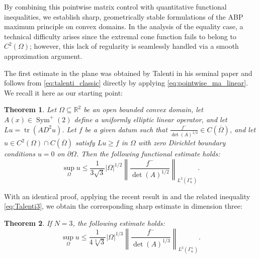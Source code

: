 \documentclass{article}
\newtheorem{theorem}{Theorem}[section]
\numberwithin{equation}{section}
\begin{document}
\noindent By combining this pointwise matrix control with quantitative functional inequalities, we establish sharp, geometrically stable formulations of the ABP maximum principle on convex domains. In the analysis of the equality case, a technical difficulty arises since the extremal cone function fails to belong to $C^2(\Omega)$; however, this lack of regularity is seamlessly handled via a smooth approximation argument.

\noindent The first estimate in the plane was obtained by Talenti in his seminal paper \cite{talenti1981} and follows from \eqref{eq:talenti_classic} directly by applying \eqref{eq:pointwise_ma_linear}. We recall it here as our starting point:

\begin{theorem}
Let $\Omega \subseteq \mathbb{R}^2$ be an open bounded convex domain, let $A(x) \in \operatorname{Sym}^+(2)$ define a uniformly elliptic linear operator, and let $Lu = \operatorname{tr}(A D^2u)$. Let $f$ be a given datum such that $\frac{f^-}{\det(A)^{1/2}} \in C(\overline{\Omega})$, and let $u \in C^2(\Omega) \cap C(\overline{\Omega})$ satisfy $Lu \ge f$ in $\Omega$ with zero Dirichlet boundary conditions $u=0$ on $\partial \Omega$. Then the following functional estimate holds:
\begin{equation}
\sup_\Omega u \le \frac{1}{3\sqrt{3}}|\Omega|^{1/2} \left\| \frac{f^-}{\det(A)^{1/2}} \right\|_{L^2(\Gamma^+_u)}.
\end{equation}
\end{theorem}

\noindent With an identical proof, applying the recent result in \cite{chen2026mahler} and the related inequality \eqref{eq:Talenti3}, we obtain the corresponding sharp estimate in dimension three:

\begin{theorem}
If $N=3$, the following estimate holds:
\begin{equation}
\sup_\Omega u \le \frac{1}{4 \sqrt[3]{3}}|\Omega|^{1/3} \left\| \frac{f^-}{\det(A)^{1/3}} \right\|_{L^3(\Gamma^+_u)}.
\end{equation}
\end{theorem}
\end{document}
